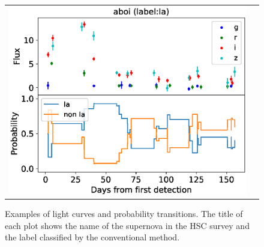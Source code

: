 \documentclass[useamsfonts]{pasj01}
\begin{document}
\begin{figure}[ht]
\begin{tabular}{cc}
\begin{minipage}{0.32\hsize}
\begin{center}
            \end{center}
        \end{minipage}
        \begin{minipage}{0.32\hsize}
            \begin{center}
                \includegraphics[width=\columnwidth]{figures/lcp_aboi.eps}
            \end{center}
        \end{minipage}
    \end{tabular}
    \caption{%
    Examples of light curves and probability transitions. The title of each plot shows the name of the supernova in the HSC survey and the label classified by the conventional method.
}%
    \label{fig:lcps}
\end{figure}
%
\end{document}
